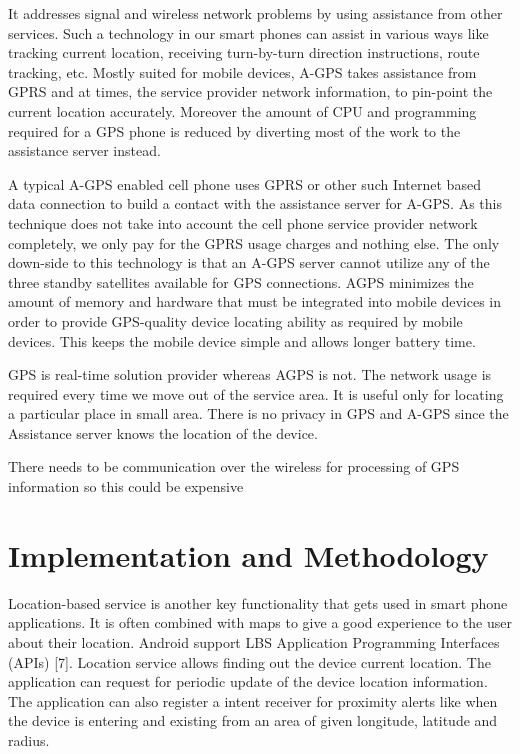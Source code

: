 \documentclass[11.4pt,a4paper,times]{report}
\begin{document}
	It addresses signal and wireless network problems by using 
	assistance from other services. Such a technology in our 
	smart phones can assist in various ways like tracking 
	current location, receiving turn-by-turn direction 
	instructions, route tracking, etc. Mostly suited for mobile devices, A-GPS takes assistance 
	from GPRS and at times, the service provider network 
	information, to pin-point the current location accurately. 
	Moreover the amount of CPU and programming required 
	for a GPS phone is reduced by diverting most of the work 
	to the assistance server instead. 
	
	A typical A-GPS enabled cell phone uses GPRS or other 
	such Internet based data connection to build a contact with 
	the assistance server for A-GPS. As this technique does 
	not take into account the cell phone service provider 
	network completely, we only pay for the GPRS usage 
	charges and nothing else. The only down-side to this 
	technology is that an A-GPS server cannot utilize any of 
	the three standby satellites available for GPS connections. 
	AGPS minimizes the amount of memory and hardware 
	that must be integrated into mobile devices in order to 
	provide GPS-quality device locating ability as required by 
	mobile devices. This keeps the mobile device simple and 
	allows longer battery time.
	
	GPS is real-time solution provider whereas AGPS is not. 
	The network usage is required every time we move out of 
	the service area. It is useful only for locating a particular 
	place in small area. There is no privacy in GPS and A-GPS 
	since the Assistance server knows the location of the 
	device. 
	
	There needs to be communication over the wireless for 
	processing of GPS information so this could be expensive
	
	\section{Implementation and Methodology}
	
	Location-based service is another key functionality that 
	gets used in smart phone applications. It is often combined 
	with maps to give a good experience to the user about their 
	location. 
	Android support LBS Application Programming Interfaces 
	(APIs) [7]. Location service allows finding out the device 
	current location. The application can request for periodic 
	update of the device location information. The application 
	can also register a intent receiver for proximity alerts like 
	when the device is entering and existing from an area of 
	given longitude, latitude and radius.
	
\end{document}

